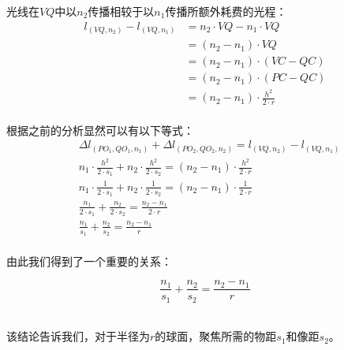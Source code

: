 \documentclass[UTF8]{ctexart}
\begin{document}
\newpage
    光线在$VQ$中以$n_2$传播相较于以$n_1$传播所额外耗费的光程：
    \begin{align}
        l_{(VQ,n_2)}-l_{(VQ,n_1)}
        &=n_2\cdot VQ-n_1\cdot VQ\\[4mm]
        &=(n_2-n_1)\cdot VQ\\[4mm]
        &=(n_2-n_1)\cdot(VC-QC)\\[4mm]
        &=(n_2-n_1)\cdot(PC-QC)\\[2mm]
        &=(n_2-n_1)\cdot\frac{h^2}{2\cdot r}
    \end{align}\\
    根据之前的分析显然可以有以下等式：\vspace{5pt}
    \begin{align}
        &\Delta l_{(PO_1,QO_1,n_1)}+\Delta l_{(PO_2,QO_2,n_2)}=l_{(VQ,n_2)}-l_{(VQ,n_1)}\\[5mm]
        &n_1\cdot\frac{h^2}{2\cdot s_1}+n_2\cdot\frac{h^2}{2\cdot s_2}=(n_2-n_1)\cdot\frac{h^2}{2\cdot r}\\[5mm]
        &n_1\cdot\frac{1}{2\cdot s_1}+n_2\cdot\frac{1}{2\cdot s_2}=(n_2-n_1)\cdot\frac{1}{2\cdot r}\\[5mm]
        &\frac{n_1}{2\cdot s_1}+\frac{n_2}{2\cdot s_2}=\frac{n_2-n_1}{2\cdot r}\\[5mm]
        &\frac{n_1}{s_1}+\frac{n_2}{s_2}=\frac{n_2-n_1}{r}
    \end{align}\\[1mm]
    由此我们得到了一个重要的关系：
    \begin{large}
        \begin{equation*}
            \frac{n_1}{s_1}+\frac{n_2}{s_2}=\frac{n_2-n_1}{r}
        \end{equation*}
    \end{large}\\
    该结论告诉我们，对于半径为$r$的球面，聚焦所需的物距$s_1$和像距$s_2$。

\newpage
\end{document}
